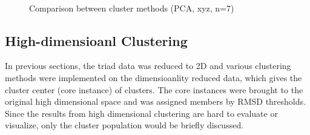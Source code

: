 \documentclass[a4paper]{article}
\begin{document}
\begin{figure}[H]
    \centering
     \\ 
    \caption{Comparison between cluster methods (PCA, xyz, n=7)}
    \label{fig: Pearson_R_methodcomp}
\end{figure}

\subsection{High-dimensioanl Clustering}

In previous sections, the triad data was reduced to 2D and various clustering methods were implemented on the dimensioanlity reduced data, which gives the cluster center (core instance) of clusters. The core instances were brought to the original high dimensional space and was assigned members by RMSD thresholds. Since the results from high dimensional clustering are hard to evaluate or visualize, only the cluster population would be briefly discussed.
\end{document}
